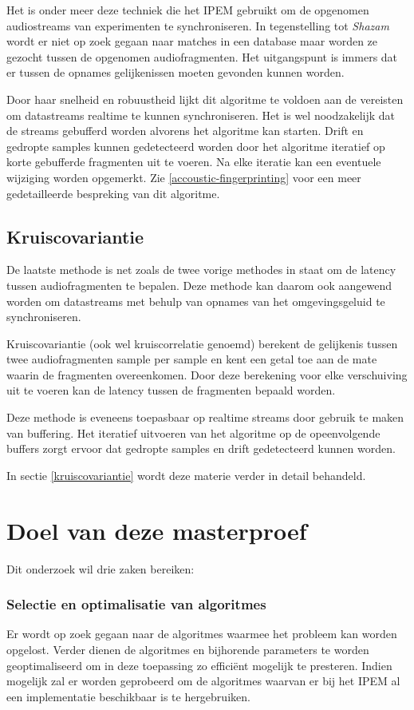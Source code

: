 Het is onder meer deze techniek die het IPEM gebruikt om de opgenomen audiostreams van experimenten te synchroniseren. In tegenstelling tot \textit{Shazam} wordt er niet op zoek gegaan naar matches in een database maar worden ze gezocht tussen de opgenomen audiofragmenten. Het uitgangspunt is immers dat er tussen de opnames gelijkenissen moeten gevonden kunnen worden.

Door haar snelheid en robuustheid lijkt dit algoritme te voldoen aan de vereisten om datastreams realtime te kunnen synchroniseren. Het is wel noodzakelijk dat de streams gebufferd worden alvorens het algoritme kan starten. Drift en gedropte samples kunnen gedetecteerd worden door het algoritme iteratief op korte gebufferde fragmenten uit te voeren. Na elke iteratie kan een eventuele wijziging worden opgemerkt. Zie \ref{accoustic-fingerprinting} voor een meer gedetailleerde bespreking van dit algoritme.

\subsection{Kruiscovariantie}

De laatste methode is net zoals de twee vorige methodes in staat om de latency tussen audiofragmenten te bepalen. Deze methode kan daarom ook aangewend worden om datastreams met behulp van opnames van het omgevingsgeluid te synchroniseren.

Kruiscovariantie (ook wel kruiscorrelatie genoemd) berekent de gelijkenis tussen twee audiofragmenten sample per sample en kent een getal toe aan de mate waarin de fragmenten overeenkomen. Door deze berekening voor elke verschuiving uit te voeren kan de latency tussen de fragmenten bepaald worden.

Deze methode is eveneens toepasbaar op realtime streams door gebruik te maken van buffering. Het iteratief uitvoeren van het algoritme op de opeenvolgende buffers zorgt ervoor dat gedropte samples en drift gedetecteerd kunnen worden.

In sectie \ref{kruiscovariantie} wordt deze materie verder in detail behandeld.

\section{Doel van deze masterproef}

Dit onderzoek wil drie zaken bereiken: 

\subsubsection{Selectie en optimalisatie van algoritmes}
Er wordt op zoek gegaan naar de algoritmes waarmee het probleem kan worden opgelost. Verder dienen de algoritmes en bijhorende parameters te worden geoptimaliseerd om in deze toepassing zo efficiënt mogelijk te presteren. Indien mogelijk zal er worden geprobeerd om de algoritmes waarvan er bij het IPEM al een implementatie beschikbaar is te hergebruiken.

